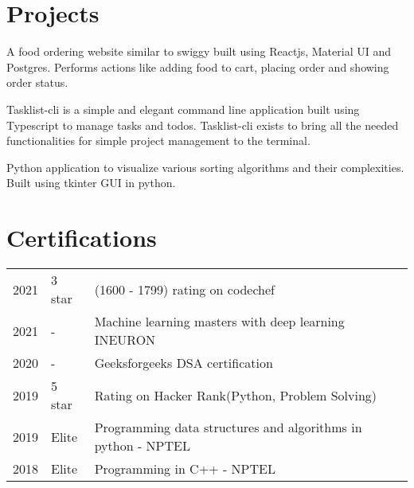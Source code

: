 \documentclass[]{manoj-resume}
\begin{document}
\begin{minipage}[t]{0.66\textwidth}

\section{Projects}
A food ordering website similar to swiggy built using Reactjs, Material UI and Postgres. Performs actions like adding food to cart, placing order and showing order status.  
\sectionsep

Tasklist-cli is a simple and elegant command line application built using Typescript to manage tasks and todos. Tasklist-cli exists to bring all the needed functionalities for simple project management to the terminal.  
\sectionsep

Python application to visualize various sorting algorithms and their complexities. Built using tkinter GUI in python.
\sectionsep


\section{Certifications} 
\begin{tabular}{rll}

2021 & 3 star  & (1600 - 1799) rating on codechef\\
2021 & - & Machine learning masters with deep learning INEURON\\
2020 & - & Geeksforgeeks DSA certification\\
2019 & 5 star & Rating on Hacker Rank(Python, Problem Solving)\\
2019 & Elite  & Programming data structures and algorithms in python - NPTEL\\
2018 & Elite & Programming in C++ - NPTEL \\

\end{tabular}
\sectionsep

\end{minipage} 
\end{document}
